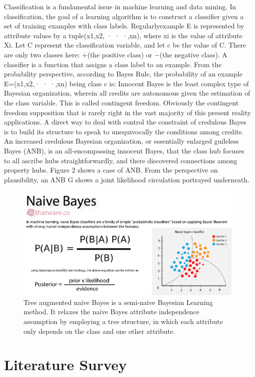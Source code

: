 \documentclass[letterpaper,12pt]{article}
\begin{document}
Classification is a fundamental issue in machine learning and data mining. In classification, the goal of a learning
algorithm is to construct a classifier given a set of training examples with class labels. Regularlyexample E is represented by attribute values by a tuple(x1,x2, · · ·,xn), where xi is the value of attribute Xi. Let C represent the classification variable, and let c be the value of C. There are only two classes here: +(the positive class) or −(the negative class). A classifier is a function that assigns a class label to an example. From the probability perspective, according to Bayes Rule, the probability of an example E=(x1,x2,· · ·,xn) being class c is:
Innocent Bayes is the least complex type of Bayesian organization, wherein all credits are autonomous given the estimation of the class variable. This is called contingent freedom. Obviously the contingent freedom supposition that is rarely right in the vast majority of this present reality applications. A direct way to deal with control the constraint of credulous Bayes is to build its structure to speak to unequivocally the conditions among credits. An increased credulous Bayesian organization, or essentially enlarged guileless Bayes (ANB), is an all-encompassing innocent Bayes, that the class hub focuses to all ascribe hubs straightforwardly, and there discovered connections among property hubs. Figure 2 shows a case of ANB. From the perspective on plausibility, an ANB G shows a joint likelihood circulation portrayed underneath.

\begin{figure}[!h]
    \centering
    \includegraphics[width=.8\textwidth]{download(6).png}
    \caption{Tree augmented naive Bayes is a semi-naive Bayesian Learning method. It relaxes the naive Bayes attribute independence assumption by employing a tree structure, in which each attribute only depends on the class and one other attribute.}
\end{figure}


\section{Literature Survey}
\end{document}

